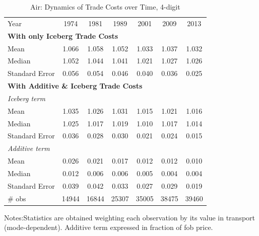 \documentclass[a4paper,11pt]{article}
\begin{document}
\begin{table}[htbp]
  \centering
  \caption{Air: Dynamics of Trade Costs over Time, 4-digit}
\begin{center}
    \begin{tabular}{l|cccccc}
   \hline\hline
Year & 1974  & 1981  & 1989  & 2001  & 2009  & 2013 \\
\multicolumn{7}{l}{\textbf{With only Iceberg Trade Costs} }  \\
Mean  & 1.066 & 1.058 & 1.052 & \multicolumn{1}{c}{1.033} & \multicolumn{1}{c}{1.037} & \multicolumn{1}{c}{1.032} \\
Median & 1.052 & 1.044 & 1.041 & \multicolumn{1}{c}{1.021} & \multicolumn{1}{c}{1.027} & \multicolumn{1}{c}{1.026}  \\
Standard Error & 0.056 & 0.054 & 0.046 & \multicolumn{1}{c}{0.040} & \multicolumn{1}{c}{0.036} & \multicolumn{1}{c}{0.025}  \\
\hline
\multicolumn{7}{l}{\textbf{With Additive \& Iceberg Trade Costs }}  \\
\textit{Iceberg term} &       &       &       &       &       &     \\
Mean  & 1.035 & 1.026 & 1.031 & \multicolumn{1}{c}{1.015} & \multicolumn{1}{c}{1.021} & \multicolumn{1}{c}{1.016}  \\
Median & 1.025 & 1.017 & 1.019 & \multicolumn{1}{c}{1.010} & \multicolumn{1}{c}{1.017} & \multicolumn{1}{c}{1.014}  \\
Standard Error & 0.036 & 0.028 & 0.030 & \multicolumn{1}{c}{0.021} & \multicolumn{1}{c}{0.024} & \multicolumn{1}{c}{0.015}  \\ 
\textit{Additive term} &       &       &       &       &       &     \\
Mean  & 0.026 & 0.021 & 0.017 & \multicolumn{1}{c}{0.012} & \multicolumn{1}{c}{0.012} & \multicolumn{1}{c}{0.010} \\
Median & 0.012 & 0.006 & 0.006 & \multicolumn{1}{c}{0.005} & \multicolumn{1}{c}{0.004} & \multicolumn{1}{c}{0.004}  \\
Standard Error & 0.039 & 0.042 & 0.033 & \multicolumn{1}{c}{0.027} & \multicolumn{1}{c}{0.029} & \multicolumn{1}{c}{0.019} \\ \hline
\# obs & 14944 & 16844 & 25307 & \multicolumn{1}{c}{35005} & \multicolumn{1}{c}{38475} & \multicolumn{1}{c}{39460}  \\
\hline\hline
    \end{tabular}%
  \end{center}
  \label{tab:result_air_rob}%
\tiny{Notes:Statistics are obtained weighting each observation by its value in transport (mode-dependent). Additive term expressed in fraction of fob price. }
\end{table}%
\end{document}
